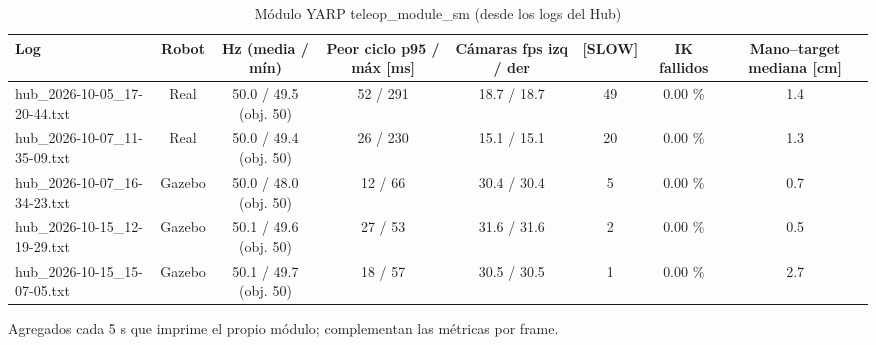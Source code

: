 \begin{table}[htbp]
\centering\small
\caption{Módulo YARP teleop\_module\_sm (desde los logs del Hub)}
\begin{tabular}{lccccccc}
\toprule
Log & Robot & Hz (media / mín) & Peor ciclo p95 / máx [ms] & Cámaras fps izq / der & [SLOW] & IK fallidos & Mano--target mediana [cm] \\
\midrule
hub\_2026-10-05\_17-20-44.txt & Real & 50.0 / 49.5 (obj. 50) & 52 / 291 & 18.7 / 18.7 & 49 & 0.00 \% & 1.4 \\
hub\_2026-10-07\_11-35-09.txt & Real & 50.0 / 49.4 (obj. 50) & 26 / 230 & 15.1 / 15.1 & 20 & 0.00 \% & 1.3 \\
hub\_2026-10-07\_16-34-23.txt & Gazebo & 50.0 / 48.0 (obj. 50) & 12 / 66 & 30.4 / 30.4 & 5 & 0.00 \% & 0.7 \\
hub\_2026-10-15\_12-19-29.txt & Gazebo & 50.1 / 49.6 (obj. 50) & 27 / 53 & 31.6 / 31.6 & 2 & 0.00 \% & 0.5 \\
hub\_2026-10-15\_15-07-05.txt & Gazebo & 50.1 / 49.7 (obj. 50) & 18 / 57 & 30.5 / 30.5 & 1 & 0.00 \% & 2.7 \\
\bottomrule
\end{tabular}
\par\footnotesize Agregados cada 5 s que imprime el propio módulo; complementan las métricas por frame.
\end{table}

